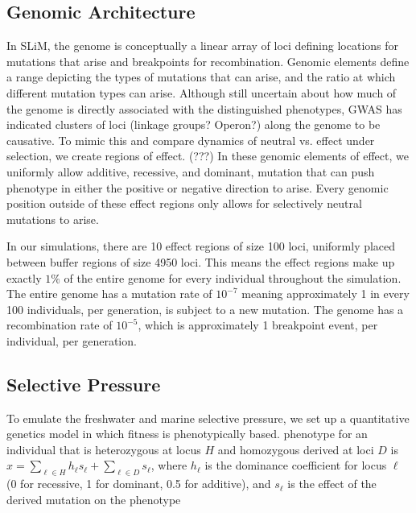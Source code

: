 \documentclass{article}
\begin{document}
\subsection*{Genomic Architecture}

In SLiM, the genome is conceptually a linear array of loci defining locations for 
mutations that arise and breakpoints for recombination. 
Genomic elements define a range depicting the types of mutations that can arise, and the ratio at which different mutation types can arise. 
Although still uncertain about how much of the genome is directly associated with the distinguished phenotypes, 
GWAS has indicated clusters of loci (linkage groups? Operon?) along the genome to be causative. 
To mimic this and compare dynamics of neutral vs. effect under selection, 
we create regions of effect. (???)
In these genomic elements of effect, we uniformly allow additive, recessive, and dominant, mutation that can push phenotype in either the positive or negative direction to arise. 
Every genomic position outside of these effect regions only allows for selectively neutral mutations to arise.

In our simulations, there are 10 effect regions of size 100 loci, uniformly placed between buffer regions of size 4950 loci. 
This means the effect regions make up exactly $1\%$ of the entire genome for every individual throughout the simulation. 
The entire genome has a mutation rate of $10^{-7}$ meaning approximately 1 in every 100 individuals, per generation, is subject to a new mutation. 
The genome has a recombination rate of $10^{-5}$, which is approximately 1 breakpoint event, per individual, per generation. 

\subsection*{Selective Pressure}



To emulate the freshwater and marine selective pressure, 
we set up a quantitative genetics model in which fitness is phenotypically based. 
phenotype for an individual that is heterozygous at locus $H$
and homozygous derived at loci $D$ is $x = \sum_{\ell \in H} h_\ell s_\ell + \sum_{\ell \in D} s_\ell$,
where $h_\ell$ is the dominance coefficient for locus $\ell$ (0 for recessive, 1 for dominant, 0.5 for additive),
and $s_\ell$ is the effect of the derived mutation on the phenotype
\end{document}
